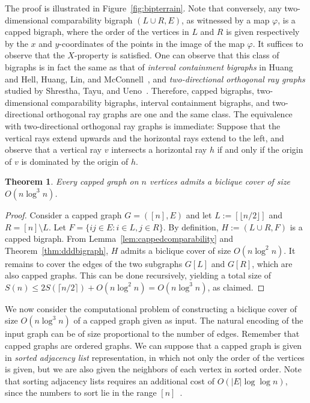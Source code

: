 \documentclass{amsart}
\newtheorem{theorem}{Theorem}%
\newcommand{\darkblue}{\color{darkblue}} %
\newcommand{\defn}[1]{\textsl{\darkblue #1}} %
\begin{document}
The proof is illustrated in Figure~\ref{fig:bipterrain}.
Note that conversely, any two-dimensional comparability bigraph $(L\cup R, E)$, as witnessed by a map $\varphi$, is a capped bigraph, where the order of the vertices in $L$ and $R$ is given respectively by the $x$ and $y$-coordinates of the points in the image of the map $\varphi$.
It suffices to observe that the $X$-property is satisfied. One can observe that 
this class of bigraphs is in fact the same as that of \defn{interval containment bigraphs} in Huang~\cite{MR2236504} and Hell, Huang, Lin, and McConnell~\cite{MR4149545}, and \defn{two-directional orthogonal ray graphs} studied by Shrestha, Tayu, and Ueno~\cite{MR2671543}.
Therefore, capped bigraphs, two-dimensional comparability bigraphs, interval containment bigraphs, and two-directional orthogonal ray graphs are one and the same class.
The equivalence with two-directional orthogonal ray graphs is immediate: Suppose that the vertical rays extend upwards and the horizontal rays extend to the left, and observe that a vertical ray $v$ intersects a horizontal ray $h$ if and only if the origin of $v$ is dominated by the origin of $h$.

\begin{theorem}
\label{thm:capped}
    Every capped graph on $n$ vertices admits a biclique cover of size $O(n\log^3 n)$. 
\end{theorem}
\begin{proof}
    Consider a capped graph $G=([n],E)$ and let $L:=[\lfloor n/2\rfloor ]$ and $R=[n]\setminus L$. 
    Let $F=\{ij\in E : i\in L, j\in R\}$.
    By definition, $H:=(L\cup R, F)$ is a capped bigraph.
    From Lemma~\ref{lem:cappedcomparability} and Theorem~\ref{thm:dddbigraph}, $H$ admits a biclique cover of size $O(n\log^2 n)$.
    It remains to cover the edges of the two subgraphs $G[L]$ and $G[R]$, which are also capped graphs. 
    This can be done recursively, yielding a total size of
    $S(n) \leq 2 S(\lceil n/2\rceil) + O(n\log^2 n) = O(n\log^3 n)$,    as claimed.
\end{proof}

We now consider the computational problem of constructing a biclique cover of size $O(n\log^3 n)$ of a capped graph given as input.
The natural encoding of the input graph can be of size proportional to the number of edges.
Remember that capped graphs are ordered graphs. We can suppose that a capped graph is given in \defn{sorted adjacency list} representation, in which not only the order of the vertices is given, but we are also given the neighbors of each vertex in sorted order.
Note that sorting adjacency lists requires an additional cost of $O(|E|\log\log n)$, since the numbers to sort lie in the range $[n]$~\cite{MR443421}.
\end{document}
